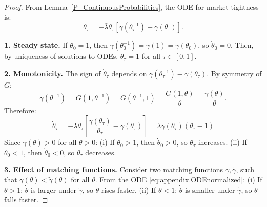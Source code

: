 \begin{proof}
From Lemma~\ref{P_ContinuousProbabilities}, the ODE for market tightness is:
\begin{equation}
\label{eq:appendix.ODEnormalized}
\dot{\theta}_{\tau} = -\bar{\lambda}\theta_{\tau}[\gamma(\theta_{\tau}^{-1}) - \gamma(\theta_{\tau})].
\end{equation}

\textbf{1. Steady state.} If $\theta_0 = 1$, then $\gamma(\theta_0^{-1}) = \gamma(1) = \gamma(\theta_0)$, so $\dot{\theta}_0 = 0$. Then, by uniqueness of solutions to ODEs, $\theta_{\tau} = 1$ for all $\tau \in [0,1]$.

\textbf{2. Monotonicity.} The sign of $\dot{\theta}_{\tau}$ depends on $\gamma(\theta_{\tau}^{-1}) - \gamma(\theta_{\tau})$. By symmetry of $G$:
\[
\gamma(\theta^{-1}) = G(1, \theta^{-1}) = G(\theta^{-1}, 1) = \frac{G(1, \theta)}{\theta} = \frac{\gamma(\theta)}{\theta}.
\]
Therefore:
\[
\dot{\theta}_{\tau} = -\bar{\lambda}\theta_{\tau}\left[\frac{\gamma(\theta_{\tau})}{\theta_{\tau}} - \gamma(\theta_{\tau})\right] = \bar{\lambda}\gamma(\theta_{\tau})(\theta_{\tau} - 1)
\]
Since $\gamma(\theta) > 0$ for all $\theta > 0$:
(i) If $\theta_0 > 1$, then $\dot{\theta}_0 > 0$, so $\theta_{\tau}$ increases.
(ii) If $\theta_0 < 1$, then $\dot{\theta}_0 < 0$, so $\theta_{\tau}$ decreases. 

\textbf{3. Effect of matching functions.} Consider two matching functions $\gamma,\tilde{\gamma}$, such that $\gamma(\theta) < \tilde{\gamma}(\theta)$ for all $θ$. From the ODE \eqref{eq:appendix.ODEnormalized}: (i) If $\theta > 1$: $\dot{\theta}$ is larger under $\tilde{\gamma}$, so $\theta$ rises faster.
(ii) If $\theta < 1$: $\dot{\theta}$ is smaller under $\tilde{\gamma}$, so $\theta$ falls faster. 
\end{proof}